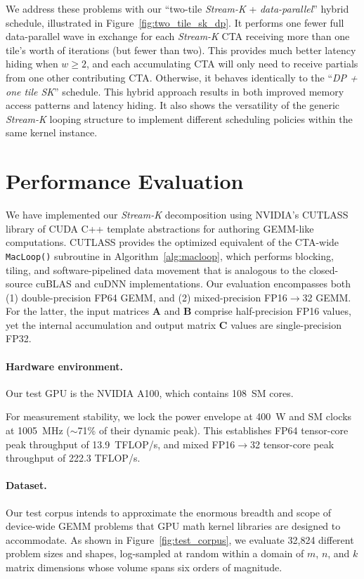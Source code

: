 We address these problems with our ``two-tile \emph{Stream-K} + \emph{data-parallel}'' hybrid schedule, illustrated in Figure~\ref{fig:two_tile_sk_dp}.
It performs one fewer full data-parallel wave in exchange for each \emph{Stream-K}
CTA receiving more than one tile's worth of iterations (but fewer than two). This provides much better latency hiding when $w\geq2$,
and each accumulating CTA will only need to receive partials from one other contributing CTA\@. Otherwise, it behaves identically to the
``\emph{DP + one tile SK}'' schedule. This hybrid approach results in both improved memory access patterns and latency hiding. It also shows the versatility of the generic \emph{Stream-K} looping structure to implement different scheduling policies within the same kernel instance.

\section{Performance Evaluation} \label{sec:evaluation}

We have implemented our \emph{Stream-K} decomposition using NVIDIA's CUTLASS library of CUDA C++ template abstractions for authoring GEMM-like computations. CUTLASS provides the optimized equivalent of the CTA-wide \lstinline{MacLoop()} subroutine in Algorithm~\ref{alg:macloop},
which performs blocking, tiling, and software-pipelined data movement that is analogous to the closed-source cuBLAS and cuDNN implementations. Our evaluation encompasses both (1) double-precision FP64 GEMM, and (2) mixed-precision FP16$\rightarrow$32 GEMM. For the latter, the input matrices \textbf{A} and \textbf{B} comprise half-precision FP16 values, yet the internal accumulation and output matrix \textbf{C} values are single-precision FP32.

\paragraph{Hardware environment.} Our test GPU is the NVIDIA A100, which contains 108~SM cores.

For measurement stability, we lock the power envelope at 400~W and SM clocks at 1005~MHz
($\sim$71\% of their dynamic peak).  This establishes FP64 tensor-core peak throughput of 13.9~TFLOP/s, and mixed FP16$\rightarrow$32
tensor-core peak throughput of 222.3 TFLOP/s.

\paragraph{Dataset.} Our test corpus intends to approximate the enormous breadth and scope of device-wide GEMM problems that GPU math kernel libraries are designed to accommodate. As shown in Figure~\ref{fig:test_corpus}, we evaluate 32,824 different problem sizes and shapes, log-sampled at random within a domain of $m$, $n$, and $k$ matrix dimensions whose volume spans six orders of magnitude.

